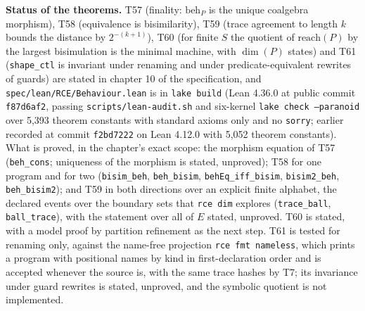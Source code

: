 \documentclass[10pt,letterpaper]{article}
\begin{document}
\textbf{Status of the theorems.} T57 (finality: \(\mathrm{beh}_P\) is
the unique coalgebra morphism), T58 (equivalence is bisimilarity), T59
(trace agreement to length \(k\) bounds the distance by \(2^{-(k+1)}\)),
T60 (for finite \(S\) the quotient of \(\mathrm{reach}(P)\) by the
largest bisimulation is the minimal machine, with \(\dim(P)\) states)
and T61 (\texttt{shape\_ctl} is invariant under renaming and under
predicate-equivalent rewrites of guards) are stated in chapter 10 of the
specification, and \texttt{spec/\allowbreak{}lean/\allowbreak{}RCE/\allowbreak{}Behaviour.\allowbreak{}lean} is in
\texttt{lake\ build} (Lean 4.36.0 at public commit \texttt{f87d6af2},
passing \texttt{scripts/\allowbreak{}lean-\allowbreak{}audit.\allowbreak{}sh} and six-kernel
\texttt{lake\ check\ --paranoid} over 5,393 theorem constants with
standard axioms only and no \texttt{sorry}; earlier recorded at commit
\texttt{f2bd7222} on Lean 4.12.0 with 5,052 theorem constants). What is
proved, in the chapter's exact
scope: the morphism equation of T57 (\texttt{beh\_cons}; uniqueness of
the morphism is stated, unproved); T58 for one program and for two
(\texttt{bisim\_beh}, \texttt{beh\_bisim}, \texttt{behEq\_\allowbreak{}iff\_\allowbreak{}bisim},
\texttt{bisim2\_beh}, \texttt{beh\_bisim2}); and T59 in both directions
over an explicit finite alphabet, the declared events over the boundary
sets that \texttt{rce\ dim} explores (\texttt{trace\_ball},
\texttt{ball\_trace}), with the statement over all of \(E\) stated,
unproved. T60 is stated, with a model proof by partition refinement as
the next step. T61 is tested for renaming only, against the name-free
projection \texttt{rce\ fmt\ nameless}, which prints a program with
positional names by kind in first-declaration order and is accepted
whenever the source is, with the same trace hashes by T7; its invariance
under guard rewrites is stated, unproved, and the symbolic quotient is
not implemented.
\end{document}
